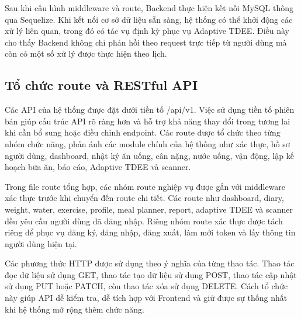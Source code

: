 \documentclass[12pt, a4paper]{report}
\begin{document}
Sau khi cấu hình middleware và route, Backend thực hiện kết nối MySQL thông qua Sequelize. Khi kết nối cơ sở dữ liệu sẵn sàng, hệ thống có thể khởi động các xử lý liên quan, trong đó có tác vụ định kỳ phục vụ Adaptive TDEE. Điều này cho thấy Backend không chỉ phản hồi theo request trực tiếp từ người dùng mà còn có một số xử lý được thực hiện theo lịch.

\subsection{Tổ chức route và RESTful API}Các API của hệ thống được đặt dưới tiền tố /api/v1. Việc sử dụng tiền tố phiên bản giúp cấu trúc API rõ ràng hơn và hỗ trợ khả năng thay đổi trong tương lai khi cần bổ sung hoặc điều chỉnh endpoint. Các route được tổ chức theo từng nhóm chức năng, phản ánh các module chính của hệ thống như xác thực, hồ sơ người dùng, dashboard, nhật ký ăn uống, cân nặng, nước uống, vận động, lập kế hoạch bữa ăn, báo cáo, Adaptive TDEE và scanner.

Trong file route tổng hợp, các nhóm route nghiệp vụ được gắn với middleware xác thực trước khi chuyển đến route chi tiết. Các route như dashboard, diary, weight, water, exercise, profile, meal planner, report, adaptive TDEE và scanner đều yêu cầu người dùng đã đăng nhập. Riêng nhóm route xác thực được tách riêng để phục vụ đăng ký, đăng nhập, đăng xuất, làm mới token và lấy thông tin người dùng hiện tại.

Các phương thức HTTP được sử dụng theo ý nghĩa của từng thao tác. Thao tác đọc dữ liệu sử dụng GET, thao tác tạo dữ liệu sử dụng POST, thao tác cập nhật sử dụng PUT hoặc PATCH, còn thao tác xóa sử dụng DELETE. Cách tổ chức này giúp API dễ kiểm tra, dễ tích hợp với Frontend và giữ được sự thống nhất khi hệ thống mở rộng thêm chức năng.
\end{document}
